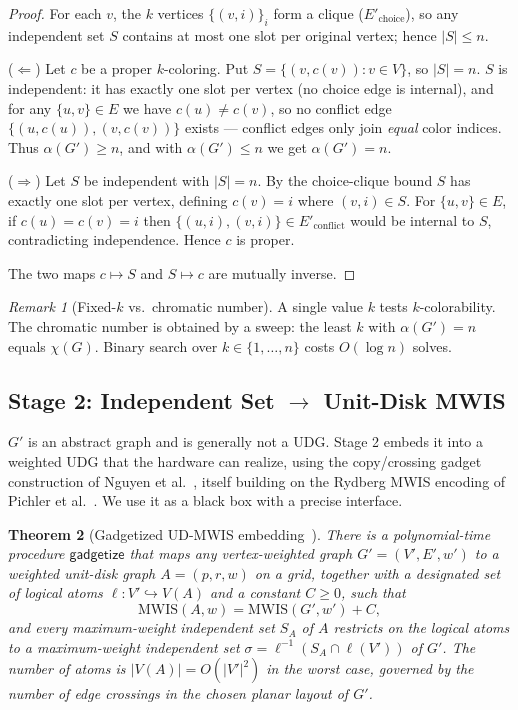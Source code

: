 \documentclass[11pt]{article}
\newtheorem{theorem}{Theorem}[section]
\theoremstyle{definition}
\theoremstyle{remark}
\newtheorem{remark}[theorem]{Remark}
\newcommand{\MWIS}{\mathrm{MWIS}}
\newcommand{\indep}{\alpha}
\begin{document}
\begin{proof}
For each $v$, the $k$ vertices $\{(v,i)\}_i$ form a clique ($E'_{\mathrm{choice}}$),
so any independent set $S$ contains at most one slot per original vertex; hence
$|S|\le n$.

($\Leftarrow$) Let $c$ be a proper $k$-coloring. Put $S=\{(v,c(v)):v\in V\}$, so
$|S|=n$. $S$ is independent: it has exactly one slot per vertex (no choice edge is
internal), and for any $\{u,v\}\in E$ we have $c(u)\ne c(v)$, so no conflict edge
$\{(u,c(u)),(v,c(v))\}$ exists --- conflict edges only join \emph{equal} color
indices. Thus $\indep(G')\ge n$, and with $\indep(G')\le n$ we get $\indep(G')=n$.

($\Rightarrow$) Let $S$ be independent with $|S|=n$. By the choice-clique bound $S$
has exactly one slot per vertex, defining $c(v)=i$ where $(v,i)\in S$. For
$\{u,v\}\in E$, if $c(u)=c(v)=i$ then $\{(u,i),(v,i)\}\in E'_{\mathrm{conflict}}$
would be internal to $S$, contradicting independence. Hence $c$ is proper.

The two maps $c\mapsto S$ and $S\mapsto c$ are mutually inverse.
\end{proof}

\begin{remark}[Fixed-$k$ vs.\ chromatic number]
A single value $k$ tests $k$-colorability. The chromatic number is obtained by a
sweep: the least $k$ with $\indep(G')=n$ equals $\chi(G)$. Binary search over
$k\in\{1,\dots,n\}$ costs $O(\log n)$ solves.
\end{remark}

\subsection{Stage 2: Independent Set $\to$ Unit-Disk MWIS}
\label{sec:gadgetize}

$G'$ is an abstract graph and is generally not a UDG. Stage 2 embeds it into a
weighted UDG that the hardware can realize, using the copy/crossing gadget
construction of Nguyen et al.~\cite{Nguyen2023}, itself building on the Rydberg MWIS
encoding of Pichler et al.~\cite{Pichler2018}. We use it as a black box with a precise
interface.

\begin{theorem}[Gadgetized UD-MWIS embedding~\cite{Nguyen2023}]
\label{thm:gadget}
There is a polynomial-time procedure $\mathsf{gadgetize}$ that maps any
vertex-weighted graph $G'=(V',E',w')$ to a weighted unit-disk graph $A=(p,r,w)$ on a
grid, together with a designated set of \emph{logical} atoms
$\ell:V'\hookrightarrow V(A)$ and a constant $C\ge 0$, such that
\[
  \MWIS(A,w) = \MWIS(G',w') + C,
\]
and every maximum-weight independent set $S_A$ of $A$ restricts on the logical atoms
to a maximum-weight independent set $\sigma=\ell^{-1}(S_A\cap \ell(V'))$ of $G'$. The
number of atoms is $|V(A)| = O\!\left(|V'|^2\right)$ in the worst case, governed by the
number of edge crossings in the chosen planar layout of $G'$.
\end{theorem}
\end{document}

